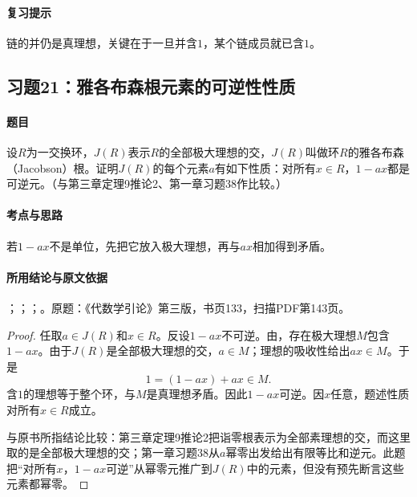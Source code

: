 \paragraph{复习提示}

链的并仍是真理想，关键在于一旦并含$1$，某个链成员就已含$1$。



\subsection{习题21：雅各布森根元素的可逆性性质}

\label{ex:3:21}

\paragraph{题目}

设$R$为一交换环，$J(R)$表示$R$的全部极大理想的交，$J(R)$叫做环$R$的雅各布森（Jacobson）根。证明$J(R)$的每个元素$a$有如下性质：对所有$x\in R$，$1-ax$都是可逆元。（与第三章定理9推论2、第一章习题38作比较。）

\paragraph{考点与思路}

若$1-ax$不是单位，先把它放入极大理想，再与$ax$相加得到矛盾。

\paragraph{所用结论与原文依据}

；；；。原题：《代数学引论》第三版，书页133，扫描PDF第143页。


\begin{proof}

任取$a\in J(R)$和$x\in R$。反设$1-ax$不可逆。由，存在极大理想$M$包含$1-ax$。由于$J(R)$是全部极大理想的交，$a\in M$；理想的吸收性给出$ax\in M$。于是
\[
1=(1-ax)+ax\in M.
\]
含$1$的理想等于整个环，与$M$是真理想矛盾。因此$1-ax$可逆。因$x$任意，题述性质对所有$x\in R$成立。

与原书所指结论比较：第三章定理9推论2把诣零根表示为全部素理想的交，而这里取的是全部极大理想的交；第一章习题38从$a$幂零出发给出有限等比和逆元。此题把“对所有$x$，$1-ax$可逆”从幂零元推广到$J(R)$中的元素，但没有预先断言这些元素都幂零。

\end{proof}

